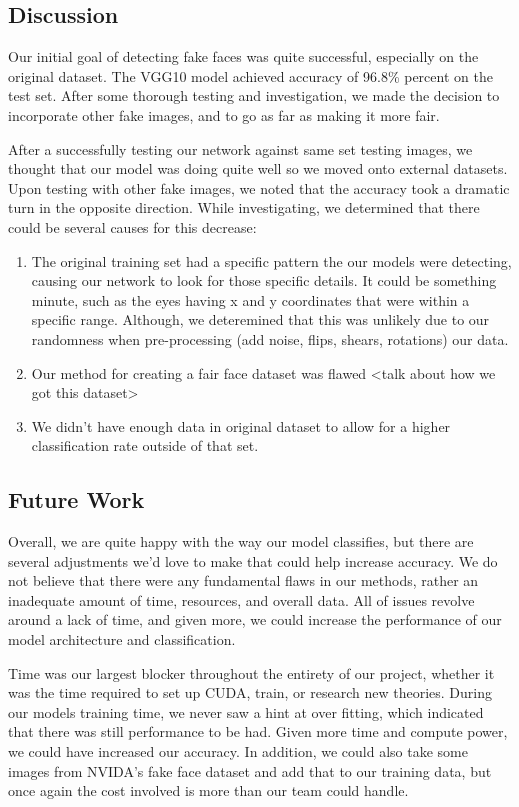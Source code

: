 \documentclass[11pt, letterpaper]{article}
\providecommand{\tightlist}{%
  \setlength{\itemsep}{0pt}\setlength{\parskip}{0pt}
}
\begin{document}
\begin{multicols}{2}
  \section{Discussion}
  Our initial goal of detecting fake faces was quite successful, especially on
  the original dataset. The VGG10 model achieved accuracy of
  96.8\% percent on the test set. After some thorough testing
  and investigation, we made the decision to incorporate other fake images, and
  to go as far as making it more fair.

  After a successfully testing our network against same set testing images, we
  thought that our model was doing quite well so we moved onto external
  datasets. Upon testing with other fake images, we noted that the accuracy took
  a dramatic turn in the opposite direction. While investigating, we determined
  that there could be several causes for this decrease:

  \begin{enumerate}
    \tightlist
    \item The original training set had a specific pattern the our
      models were detecting, causing our network to look for those
      specific details. It could be something minute, such as the eyes
      having x and y coordinates that were within a specific
      range. Although, we deteremined that this was unlikely due to
      our randomness when pre-processing (add noise, flips, shears,
      rotations) our data.
    \item Our method for creating a fair face dataset was flawed <talk
      about how we got this dataset>
    \item We didn't have enough data in original dataset to allow for
      a higher classification rate outside of that set.
  \end{enumerate}

  \subsection{Future Work}
  Overall, we are quite happy with the way our model classifies, but
  there are several adjustments we'd love to make that could help
  increase accuracy. We do not believe that there were any fundamental
  flaws in our methods, rather an inadequate amount of time,
  resources, and overall data. All of issues revolve around a lack of
  time, and given more, we could increase the performance of our model
  architecture and classification.

  Time was our largest blocker throughout the entirety of our project, whether
  it was the time required to set up CUDA, train, or research new theories.
  During our models training time, we never saw a hint at over fitting, which
  indicated that there was still performance to be had. Given more time and
  compute power, we could have increased our accuracy. In addition, we could
  also take some images from NVIDA's fake face dataset and add that to our
  training data, but once again the cost involved is more than our team could
  handle.


\end{multicols}
\end{document}

